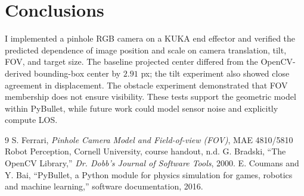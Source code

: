 \documentclass[11pt,letterpaper]{article}
\begin{document}
\section{Conclusions}
I implemented a pinhole RGB camera on a KUKA end effector and verified the predicted dependence of image position and scale on camera translation, tilt, FOV, and target size. The baseline projected center differed from the OpenCV-derived bounding-box center by $2.91$ px; the tilt experiment also showed close agreement in displacement. The obstacle experiment demonstrated that FOV membership does not ensure visibility. These tests support the geometric model within PyBullet, while future work could model sensor noise and explicitly compute LOS.

\begin{thebibliography}{9}
 S. Ferrari, \emph{Pinhole Camera Model and Field-of-view (FOV)}, MAE 4810/5810 Robot Perception, Cornell University, course handout, n.d.
 G. Bradski, ``The OpenCV Library,'' \emph{Dr. Dobb's Journal of Software Tools}, 2000.
 E. Coumans and Y. Bai, ``PyBullet, a Python module for physics simulation for games, robotics and machine learning,'' software documentation, 2016.
\end{thebibliography}
\end{document}
